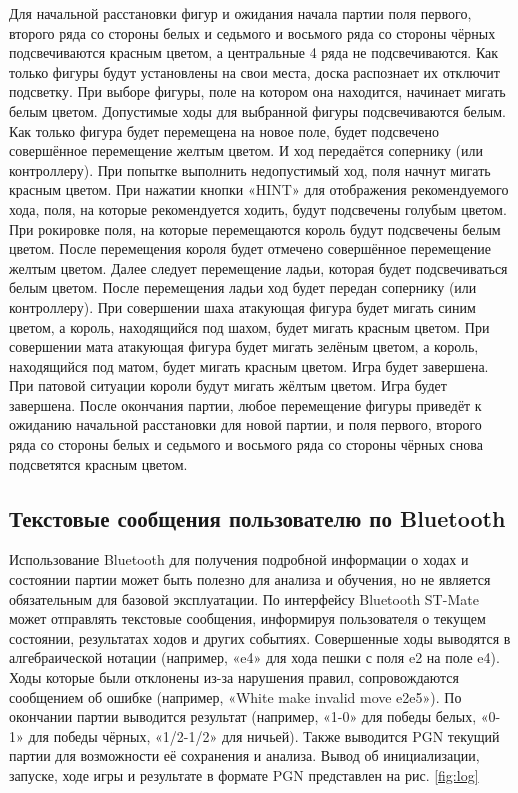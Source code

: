 \documentclass[a4paper,12pt]{article}
\begin{document}
Для начальной расстановки фигур и ожидания начала партии поля первого, второго ряда со стороны белых и седьмого и восьмого ряда со стороны чёрных подсвечиваются красным цветом, а центральные 4 ряда не подсвечиваются.
Как только фигуры будут установлены на свои места, доска распознает их отключит подсветку.
При выборе фигуры, поле на котором она находится, начинает мигать белым цветом. Допустимые ходы для выбранной фигуры подсвечиваются белым.
Как только фигура будет перемещена на новое поле, будет подсвечено совершённое перемещение желтым цветом. И ход передаётся сопернику (или контроллеру).
При попытке выполнить недопустимый ход, поля начнут мигать красным цветом.
При нажатии кнопки «HINT» для отображения рекомендуемого хода, поля, на которые рекомендуется ходить, будут подсвечены голубым цветом.
При рокировке поля, на которые перемещаются король будут подсвечены белым цветом. После перемещения короля будет отмечено совершённое перемещение желтым цветом. 
Далее следует перемещение ладьи, которая будет подсвечиваться белым цветом. После перемещения ладьи ход будет передан сопернику (или контроллеру).
При совершении шаха атакующая фигура будет мигать синим цветом, а король, находящийся под шахом, будет мигать красным цветом.
При совершении мата атакующая фигура будет мигать зелёным цветом, а король, находящийся под матом, будет мигать красным цветом. Игра будет завершена.
При патовой ситуации короли будут мигать жёлтым цветом. Игра будет завершена.
После окончания партии, любое перемещение фигуры приведёт к ожиданию начальной расстановки для новой партии, и поля первого, второго ряда со стороны белых и седьмого и восьмого ряда со стороны чёрных снова подсветятся красным цветом.

\subsection{Текстовые сообщения пользователю по Bluetooth}
Использование Bluetooth для получения подробной информации о ходах и состоянии партии может быть полезно для анализа и обучения, но не является обязательным для базовой эксплуатации.
По интерфейсу Bluetooth ST-Mate может отправлять текстовые сообщения, информируя пользователя о текущем состоянии, результатах ходов и других событиях.
Совершенные ходы выводятся в алгебраической нотации (например, «e4» для хода пешки с поля e2 на поле e4).
Ходы которые были отклонены из-за нарушения правил, сопровождаются сообщением об ошибке (например, «White make invalid move e2e5»).
По окончании партии выводится результат (например, «1-0» для победы белых, «0-1» для победы чёрных, «1/2-1/2» для ничьей).
Также выводится PGN текущий партии для возможности её сохранения и анализа. Вывод об инициализации, запуске, ходе игры и результате в формате PGN представлен на рис. \ref{fig:log}
\end{document}
